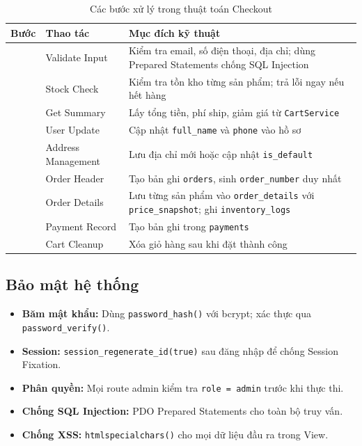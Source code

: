 \documentclass[11pt, a4paper]{article}
\begin{document}
\begin{table}[H]
    \centering
    \caption{Các bước xử lý trong thuật toán Checkout}
    \vspace{0.2cm}
    \begin{tabularx}{\linewidth}{|>{\centering\arraybackslash}p{1cm}
                                  |>{\raggedright\arraybackslash}p{3cm}
                                  |Y|}
        \hline
        \textbf{Bước} & \textbf{Thao tác} & \textbf{Mục đích kỹ thuật} \\  & Validate Input & Kiểm tra email, số điện thoại, địa chỉ; dùng Prepared Statements chống SQL Injection \\  & Stock Check & Kiểm tra tồn kho từng sản phẩm; trả lỗi ngay nếu hết hàng \\  & Get Summary & Lấy tổng tiền, phí ship, giảm giá từ \texttt{CartService} \\  & User Update & Cập nhật \texttt{full\_name} và \texttt{phone} vào hồ sơ \\  & Address Management & Lưu địa chỉ mới hoặc cập nhật \texttt{is\_default} \\  & Order Header & Tạo bản ghi \texttt{orders}, sinh \texttt{order\_number} duy nhất \\  & Order Details & Lưu từng sản phẩm vào \texttt{order\_details} với \texttt{price\_snapshot}; ghi \texttt{inventory\_logs} \\  & Payment Record & Tạo bản ghi trong \texttt{payments} \\  & Cart Cleanup & Xóa giỏ hàng sau khi đặt thành công \\ \hline
    \end{tabularx}
\end{table}

\subsection{Bảo mật hệ thống}

\begin{itemize}[leftmargin=*]
    \item \textbf{Băm mật khẩu:} Dùng \texttt{password\_hash()} với bcrypt; xác thực qua \texttt{password\_verify()}.
    \item \textbf{Session:} \texttt{session\_regenerate\_id(true)} sau đăng nhập để chống Session Fixation.
    \item \textbf{Phân quyền:} Mọi route admin kiểm tra \texttt{role = admin} trước khi thực thi.
    \item \textbf{Chống SQL Injection:} PDO Prepared Statements cho toàn bộ truy vấn.
    \item \textbf{Chống XSS:} \texttt{htmlspecialchars()} cho mọi dữ liệu đầu ra trong View.
\end{itemize}
\end{document}
